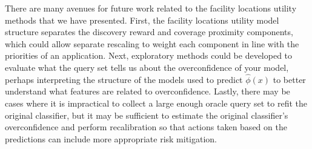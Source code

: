 \documentclass[letterpaper]{article} %
\begin{document}
There are many avenues for future work related to the facility locations utility methods that we have presented. First, the facility locations utility model structure separates the discovery reward and coverage proximity components, which could allow separate rescaling to weight each component in line with the priorities of an application. Next, exploratory methods could be developed to evaluate what the query set tells us about the overconfidence of your model, perhaps interpreting the structure of the models used to predict $\hat{\phi}(x)$ to better understand what features are related to overconfidence. Lastly, there may be cases where it is impractical to collect a large enough oracle query set to refit the original classifier, but it may be sufficient to estimate the original classifier’s overconfidence and perform recalibration so that actions taken based on the predictions can include more appropriate risk mitigation. 


\newpage



\end{document}
